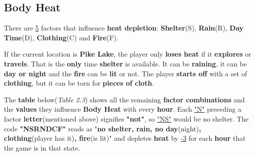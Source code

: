 		\subsection{Body Heat}
			\par There are \underline{5} factors that influence \textbf{heat depletion}: \textbf{Shelter}(S), \textbf{Rain}(R), \textbf{Day Time}(D), \textbf{Clothing}(C) and \textbf{Fire}(F). 
			\par If the current location is \textbf{Pike Lake}, the player only \textbf{loses heat} if it \textbf{explores} or \textbf{travels}. That is the \textbf{only} time \textbf{shelter} is available. It can be \textbf{raining}, it can be \textbf{day or night} and the \textbf{fire} can be \textbf{lit} or not. The player \textbf{starts off} with a set of \textbf{clothing}, but it can be torn for \textbf{pieces of cloth}.
			\par The \textbf{table} below(\textit{Table 2.3}) shows all the remaining \textbf{factor combinations} and the \textbf{values} they influence \textbf{Body Heat} with every \textbf{hour}. Each \underline{"N"} preceding a factor \textbf{letter}(mentioned above) signifies \textbf{"not"}, so \underline{"NS"} would be no shelter. The code \textbf{"NSRNDCF"} reads as "\textbf{no shelter, rain, no day}(night)\textbf{, clothing}(player has it)\textbf{, fire}(is lit)" and depletes \textbf{heat} by \underline{-3} for each \textbf{hour} that the game is in that state.
			

